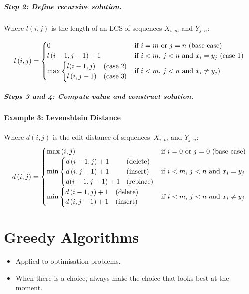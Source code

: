 \documentclass[twocolumn,english]{article}
\numberwithin{equation}{section}
\numberwithin{figure}{section}
\numberwithin{table}{section}
\begin{document}
\subparagraph{Step 2: Define recursive solution.}

Where $l\left(i,j\right)$ is the length of an LCS of sequences $X_{i..m}$
and $Y_{j..n}$:

\[
l\left(i,j\right)=\begin{cases}
0 & \text{if \ensuremath{i=m} or \ensuremath{j=n} (base case)}\\
l\left(i-1,j-1\right)+1 & \text{if \ensuremath{i<m}, \ensuremath{j<n} and \ensuremath{x_{i}=y_{j}} (case 1)}\\
\max\begin{cases}
l(i-1,j) & \text{(case 2)}\\
l\left(i,j-1\right) & \text{(case 3)}
\end{cases} & \text{if \ensuremath{i<m}, \ensuremath{j<n} and \ensuremath{x_{i}\neq y_{j}})}
\end{cases}
\]

\subparagraph{Steps 3 and 4: Compute value and construct solution.}

\paragraph{Example 3: Levenshtein Distance}

Where $d\left(i,j\right)$ is the edit distance of sequences~$X_{i..m}$
and $Y_{j..n}$:
\[
d\left(i,j\right)=\begin{cases}
\max\left(i,j\right) & \text{if \ensuremath{i=0} or \ensuremath{j=0} (base case)}\\
\min\begin{cases}
d\left(i-1,j\right)+1 & \text{(delete)}\\
d\left(i,j-1\right)+1 & \text{(insert)}\\
d(i-1,j-1)+1 & \text{(replace)}
\end{cases} & \text{if \ensuremath{i<m}, \ensuremath{j<n} and \ensuremath{x_{i}=y_{j}}}\\
\min\begin{cases}
d\left(i-1,j\right)+1 & \text{(delete)}\\
d\left(i,j-1\right)+1 & \text{(insert)}
\end{cases} & \text{if \ensuremath{i<m}, \ensuremath{j<n} and \ensuremath{x_{i}\neq y_{j}}}
\end{cases}
\]

\section{Greedy Algorithms}
\begin{itemize}
\item Applied to optimisation problems.
\item When there is a choice, always make the choice that looks best at
the moment.
\end{itemize}
\end{document}
